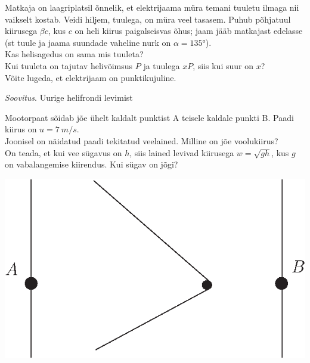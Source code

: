 \documentclass[10pt, twoside]{article}
\begin{document}
{%

Matkaja on laagriplatsil õnnelik, et elektrijaama müra temani tuuletu ilmaga nii vaikselt kostab. Veidi hiljem, tuulega, on müra veel tasasem. Puhub põhjatuul kiirusega $\beta c$, kus $c$ on heli kiirus paigalseisvas õhus; jaam jääb matkajast edelasse
(st tuule ja jaama suundade vaheline nurk on $\alpha = \ang{135}$).\\
\osa Kas helisagedus on sama mis tuuleta?\\
\osa Kui tuuleta on tajutav helivõimsus $P$ ja tuulega $xP$, siis kui suur on $x$?\\
Võite lugeda, et elektrijaam on punktikujuline. 

\emph{Soovitus}. Uurige helifrondi levimist
\probend
\bigskip


Mootorpaat sõidab jõe ühelt kaldalt punktist A teisele kaldale punkti B. Paadi kiirus on $u=\SI{7}{m/s}$.\\
\osa Joonisel on näidatud paadi tekitatud veelained. Milline on jõe voolukiirus?\\
\osa On teada, et kui vee sügavus on $h$, siis lained levivad kiirusega $w=\sqrt{gh}$, kus $g$ on vabalangemise kiirendus.
Kui sügav on jõgi?

\begin{center}
\includegraphics[width=0.55\linewidth]{2009-v3g-08-paat.eps}
\end{center}
\probend
\bigskip


}
\end{document}

